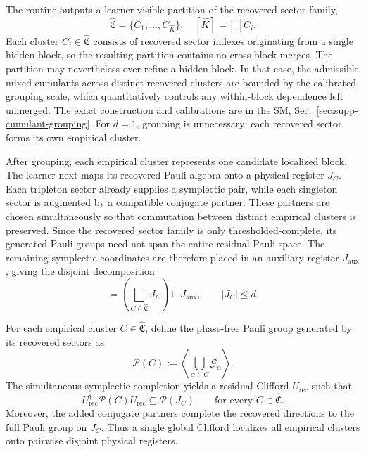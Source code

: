 \documentclass[
  aps,
  prx,
  reprint,
  superscriptaddress,
  amsmath,
  amssymb,
  nofootinbib,
  longbibliography
]{revtex4-2}
\newcommand{\Pc}{\mathcal{P}}
\begin{document}
The routine outputs a learner-visible partition of the recovered sector family,
\begin{equation}
\widehat{\mathfrak C}
=
\{C_1,\ldots,C_{\widehat K}\},
\quad
[\widehat K ]
=
\bigsqcup C_i.
\end{equation}
Each cluster $C_i\in\widehat{\mathfrak C}$ consists of recovered sector indexes
originating from a single hidden block, so the resulting partition contains no
cross-block merges. The partition may nevertheless over-refine a hidden block.
In that case, the admissible mixed cumulants across distinct recovered clusters
are bounded by the calibrated grouping scale, which quantitatively controls any
within-block dependence left unmerged.
The exact construction and calibrations are in the SM,
Sec.~\ref{sec:supp-cumulant-grouping}.
For $d=1$, grouping is unnecessary: each recovered sector forms its own empirical cluster.



After grouping, each empirical cluster represents one candidate localized block. The learner next maps its recovered Pauli algebra onto a physical register $J_C$.
Each tripleton sector already supplies a symplectic pair, while each singleton
sector is augmented by a compatible conjugate partner. These partners are
chosen simultaneously so that commutation between distinct empirical clusters
is preserved. Since the recovered sector family is only
thresholded-complete, its generated Pauli groups need not span the entire
residual Pauli space. The remaining symplectic coordinates are therefore
placed in an auxiliary register $J_{\mathrm{aux}}$, giving the disjoint
decomposition
\begin{equation}
[m]
=
\left(
\bigsqcup_{C\in\widehat{\mathfrak C}}J_C
\right)
\sqcup J_{\mathrm{aux}},
\qquad
|J_C|\le d.
\end{equation}

For each empirical cluster $C\in\widehat{\mathfrak C}$, define the phase-free
Pauli group generated by its recovered sectors as
\begin{equation}
\mathcal P(C)
:=
\left\langle
\bigcup_{\alpha\in C}\mathcal G_\alpha
\right\rangle.
\end{equation}
The simultaneous symplectic completion yields a residual Clifford
$U_{\mathrm{rec}}$ such that
\begin{equation}
U_{\mathrm{rec}}^\dagger
\mathcal P(C)
U_{\mathrm{rec}}
\subseteq
\Pc(J_C)
\qquad
\text{for every }C\in\widehat{\mathfrak C}.
\end{equation}
Moreover, the added conjugate partners complete the recovered directions to
the full Pauli group on $J_C$. Thus a single global Clifford localizes all
empirical clusters onto pairwise disjoint physical registers.
\end{document}
